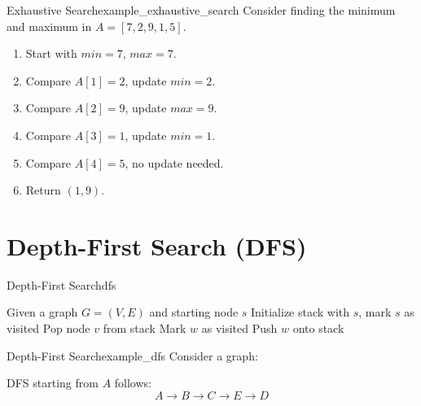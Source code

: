 \begin{exampletcb}
    {Exhaustive Search}{example_exhaustive_search}
    Consider finding the minimum and maximum in $A = [7, 2, 9, 1, 5]$.

    \begin{enumerate}
        \item Start with $min = 7$, $max = 7$.
        \item Compare $A[1] = 2$, update $min = 2$.
        \item Compare $A[2] = 9$, update $max = 9$.
        \item Compare $A[3] = 1$, update $min = 1$.
        \item Compare $A[4] = 5$, no update needed.
        \item Return $(1, 9)$.
    \end{enumerate}
\end{exampletcb}


\section{Depth-First Search (DFS)}
\begin{algorithmtcb}
    {Depth-First Search}{dfs}
    \begin{algorithmic}
        \State{} Given a graph $G = (V, E)$ and starting node $s$
        \State{} Initialize stack with $s$, mark $s$ as visited
            \State{} Pop node $v$ from stack
                \State{} Mark $w$ as visited
                \State{} Push $w$ onto stack
            \EndFor{}
        \EndWhile{}
    \end{algorithmic}
\end{algorithmtcb}

\begin{exampletcb}
    {Depth-First Search}{example_dfs}
    Consider a graph:
    \begin{center}
    \end{center}

    DFS starting from $A$ follows:
    \[
    A \rightarrow B \rightarrow C \rightarrow E \rightarrow D
    \]
\end{exampletcb}

